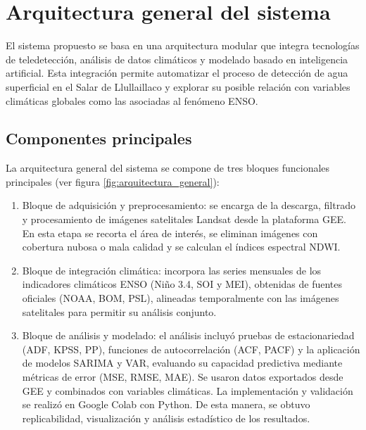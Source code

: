 \newpage
\section{Arquitectura general del sistema}

El sistema propuesto se basa en una arquitectura modular que integra tecnologías de teledetección, análisis de datos climáticos y modelado basado en inteligencia artificial. Esta integración permite automatizar el proceso de detección de agua superficial en el Salar de Llullaillaco y explorar su posible relación con variables climáticas globales como las asociadas al fenómeno ENSO.

\subsection*{Componentes principales}

La arquitectura general del sistema se compone de tres bloques funcionales principales (ver figura \ref{fig:arquitectura_general}):

\begin{enumerate}
    \item Bloque de adquisición y preprocesamiento: se encarga de la descarga, filtrado y procesamiento de imágenes satelitales Landsat desde la plataforma GEE. En esta etapa se recorta el área de interés, se eliminan imágenes con cobertura nubosa o mala calidad y se calculan el índices espectral NDWI.
    
    \item Bloque de integración climática: incorpora las series mensuales de los indicadores climáticos ENSO (Niño 3.4, SOI y MEI), obtenidas de fuentes oficiales (NOAA, BOM, PSL), alineadas temporalmente con las imágenes satelitales para permitir su análisis conjunto.

    \item Bloque de análisis y modelado: el análisis incluyó pruebas de estacionariedad (ADF, KPSS, PP), funciones de autocorrelación (ACF, PACF) y la aplicación de modelos SARIMA y VAR, evaluando su capacidad predictiva mediante métricas de error (MSE, RMSE, MAE). Se usaron datos exportados desde GEE y combinados con variables climáticas. La implementación y validación se realizó en Google Colab con Python. De esta manera, se obtuvo replicabilidad, visualización y análisis estadístico de los resultados.
\end{enumerate}

